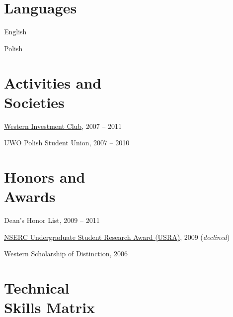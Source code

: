 \documentclass[margin,line]{resume}
\begin{document}
\begin{resume}
\section{\mysidestyle Languages}

\begin{list2}
	\item English
	\item Polish
\end{list2}

\section{\mysidestyle Activities and\\Societies}

\begin{list2}
	\item \href{http://www.westerninvestmentclub.com/}{Western Investment Club}, 2007 -- 2011
	\item UWO Polish Student Union, 2007 -- 2010
\end{list2}

\section{\mysidestyle Honors and\\Awards}

\begin{list2}
	\item Dean's Honor List, 2009 -- 2011
	\item \href{http://www.uwo.ca/research/funding/internal/nserc_usra.html}{NSERC Undergraduate Student Research Award (USRA)}, 2009	\hfill(\textsl{declined})
	\item Western Scholarship of Distinction, 2006 
\end{list2}


\newpage


\section{\mysidestyle Technical\\Skills Matrix} 


\end{resume}
\end{document}
